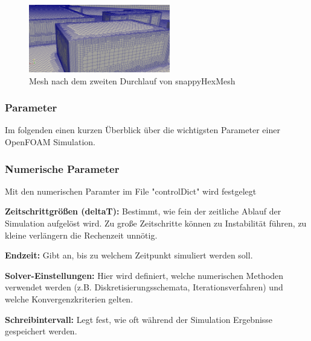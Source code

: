 \begin{figure}
    \centering
    \includegraphics[width=0.55\textwidth]{papers/openfoam/Bilder/Snappy_fein.png}
    \caption{Mesh nach dem zweiten Durchlauf von snappyHexMesh}
    \label{fig:snappyfeinbild}
\end{figure}
\subsubsection{Parameter\label{openfoam:section:Parameter}}
Im folgenden einen kurzen Überblick über die wichtigsten Parameter einer OpenFOAM Simulation.

\subsubsection{Numerische Parameter\label{openfoam:section:Numerische Parameter}}
Mit den numerischen Paramter im File "controlDict" wird festgelegt
\begin{numpam}
    \item \textbf{Zeitschrittgrößen (deltaT):} Bestimmt, wie fein der zeitliche Ablauf der Simulation aufgelöst wird. Zu große Zeitschritte können zu Instabilität führen, zu kleine verlängern die Rechenzeit unnötig.
    \item \textbf{Endzeit:} Gibt an, bis zu welchem Zeitpunkt simuliert werden soll.
    \item \textbf{Solver-Einstellungen:} Hier wird definiert, welche numerischen Methoden verwendet werden (z.B. Diskretisierungsschemata, Iterationsverfahren) und welche Konvergenzkriterien gelten.
    \item \textbf{Schreibintervall:} Legt fest, wie oft während der Simulation Ergebnisse gespeichert werden.
\end{numpam}

